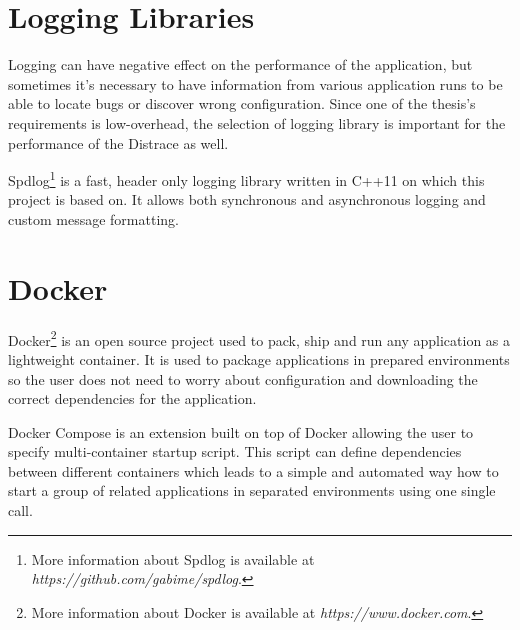\section{Logging Libraries}
Logging can have negative effect on the performance of the application, but sometimes it's necessary to have information from various application runs to be able to locate bugs or discover wrong configuration. Since one of the thesis's requirements is low-overhead, the selection of logging library is important for the performance of the Distrace as well. 

Spdlog\footnote{More information about Spdlog is available at \textit{https://github.com/gabime/spdlog}.} is a fast, header only logging library written in C++11 on which this project is based on. It allows both synchronous and asynchronous logging and custom message formatting.
\section{Docker}
Docker\footnote{More information about Docker is available at \textit{https://www.docker.com}.} is an open source project used to pack, ship and run any application as a lightweight container. It is used to package applications in prepared environments so the user does not need to worry about configuration and downloading the correct dependencies for the application. 

Docker Compose is an extension built on top of Docker allowing the user to specify multi-container startup script. This script can define dependencies between different containers which leads to a simple and automated way how to start a group of related applications in separated environments using one single call. 

